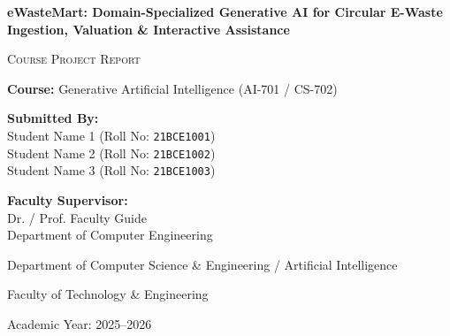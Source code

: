 \documentclass[12pt,a4paper]{article}
\begin{document}
\begin{titlepage}
    \centering
    \vspace*{1.5cm}
    
    {\Huge \bfseries eWasteMart: Domain-Specialized Generative AI for Circular E-Waste Ingestion, Valuation \& Interactive Assistance\par}
    
    \vspace{0.8cm}
    {\Large \textsc{Course Project Report}\par}
    {\large \textbf{Course:} Generative Artificial Intelligence (AI-701 / CS-702)\par}
    
    \vspace{1.5cm}
    
    \begin{minipage}[t]{0.45\textwidth}
        \flushleft
        \textbf{Submitted By:}\\[0.2cm]
        Student Name 1 (Roll No: \texttt{21BCE1001})\\[0.1cm]
        Student Name 2 (Roll No: \texttt{21BCE1002})\\[0.1cm]
        Student Name 3 (Roll No: \texttt{21BCE1003})
    \end{minipage}
    \hfill
    \begin{minipage}[t]{0.45\textwidth}
        \flushright
        \textbf{Faculty Supervisor:}\\[0.2cm]
        Dr. / Prof. Faculty Guide\\[0.1cm]
        Department of Computer Engineering
    \end{minipage}
    
    \vfill
    
    {\large Department of Computer Science \& Engineering / Artificial Intelligence\par}
    {\large Faculty of Technology \& Engineering\par}
    {\large Academic Year: 2025--2026\par}
    
    \vspace{1cm}
\end{titlepage}

\newpage
\tableofcontents
\newpage

\end{document}
